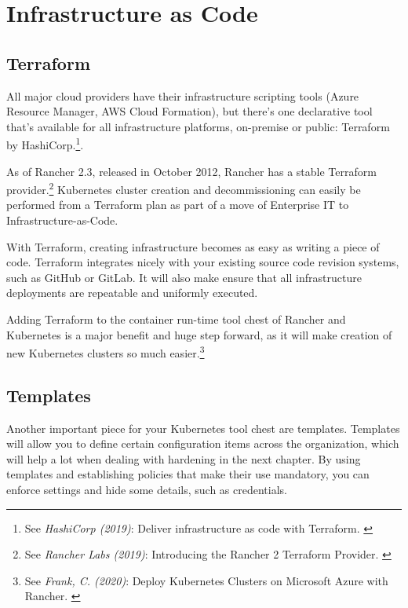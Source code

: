 %
%

\pagebreak
\section{Infrastructure as Code}

\onehalfspacing

\subsection{Terraform}

All major cloud providers have their infrastructure scripting tools (Azure Resource Manager, AWS Cloud Formation), but there's one declarative tool that's available for all infrastructure platforms, on-premise or public: Terraform by HashiCorp.\footnote{See \textit{HashiCorp (2019)}: Deliver infrastructure as code with Terraform. \cite{terraform}}.

As of Rancher 2.3, released in October 2012, Rancher has a stable Terraform provider.\footnote{See \textit{Rancher Labs (2019)}: Introducing the Rancher 2 Terraform Provider. \cite{terraformProvider}} Kubernetes cluster creation and decommissioning can easily be performed from a Terraform plan as part of a move of Enterprise IT to Infrastructure-as-Code.

With Terraform, creating infrastructure becomes as easy as writing a piece of code. Terraform integrates nicely with your existing source code revision systems, such as GitHub or GitLab. It will also make ensure that all infrastructure deployments are repeatable and uniformly executed.

Adding Terraform to the container run-time tool chest of Rancher and Kubernetes is a major benefit and huge step forward, as it will make creation of new Kubernetes clusters so much easier.\footnote{See \textit{Frank, C. (2020)}: Deploy Kubernetes Clusters on Microsoft Azure with Rancher. \cite{deployAzure}}

\subsection{Templates}

Another important piece for your Kubernetes tool chest are templates. Templates will allow you to define certain configuration items across the organization, which will help a lot when dealing with hardening in the next chapter. By using templates and establishing policies that make their use mandatory, you can enforce settings and hide some details, such as credentials.

